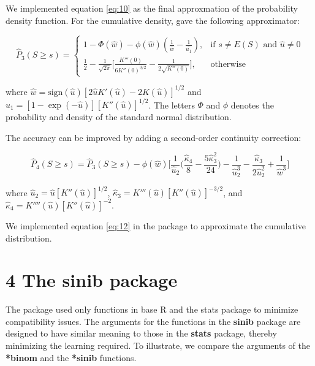We implemented equation \ref{eq:10} as the final approxmation of the probability density function. For the cumulative density, \cite{Anonymous:0hq1uBaf} gave the following approximator: 

\begin{equation}
\hat{P}_3(S \geq s)=
\begin{cases}
1-\Phi(\hat{w})-\phi(\hat{w}) (\frac{1}{\hat{w}} - \frac{1}{\hat{u_1}}), & \text{if } s \neq E(S) \text{ and } \hat{u} \neq 0 \\
\frac{1}{2} - \frac{1}{\sqrt{2 \pi}} \big[\frac{K'''(0)}{6 K''(0)^{3/2}} - \frac{1}{2 \sqrt{K''(0)}} \big], & \text{otherwise}
\end{cases}
\end{equation}

where $\hat{w}= \text{sign}(\hat{u}) [2 \hat{u} K'(\hat{u}) - 2K(\hat{u})]^{1/2}$ and $\hat{u}_1=[1-\exp(-\hat{u})][K''(\hat{u})]^{1/2}$. The letters $\Phi$ and $\phi$ denotes the probability and density of the standard normal distribution. 

The accuracy can be improved by adding a second-order continuity correction:

\begin{equation}
\hat{P}_4(S \geq s)=\hat{P}_3(S \geq s) - \phi(\hat{w}) \Big [ \frac{1}{\hat{u}_2} \Big ( \frac{\hat{\kappa}_4}{8} - \frac{5 \hat{\kappa}^2_3}{24} \Big ) - \frac{1}{\hat{u}_2^3} - \frac{\hat{\kappa}_3}{2 \hat{u}_2^2} + \frac{1}{\hat{w}^3} \Big]
\label{eq:12}
\end{equation}

where $\hat{u}_2=\hat{u}[K''(\hat{u})]^{1/2}$, $\hat{\kappa}_3=K'''(\hat{u}) [K''(\hat{u})]^{-3/2}$, and $\hat{\kappa}_4 = K''''(\hat{u}) [K''(\hat{u})]^{-2}$.

We implemented equation \ref{eq:12} in the package to approximate the cumulative distribution. 

\section{4 The \textbf{sinib} package}

The package used only functions in base R and the stats package to minimize compatibility issues. The arguments for the functions in the \textbf{sinib} package are designed to have similar meaning to those in the \textbf{stats} package, thereby minimizing the learning required. To illustrate, we compare the arguments of the \textbf{*binom} and the \textbf{*sinib} functions. 

